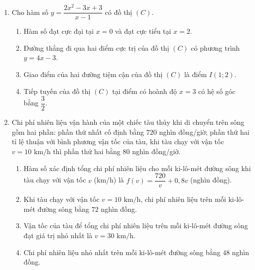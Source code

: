 \documentclass[12pt,a4paper]{article}
\begin{document}
\begin{enumerate}[label=\textbf{Câu \arabic*:}, leftmargin=*]

\item Cho hàm số $y = \dfrac{2x^2 - 3x + 3}{x - 1}$ có đồ thị $(C)$.
\begin{enumerate}[label=\textbf{\alph*)}]
    \item Hàm số đạt cực đại tại $x = 0$ và đạt cực tiểu tại $x = 2$.
    \item Đường thẳng đi qua hai điểm cực trị của đồ thị $(C)$ có phương trình $y = 4x - 3$.
    \item Giao điểm của hai đường tiệm cận của đồ thị $(C)$ là điểm $I(1; 2)$.
    \item Tiếp tuyến của đồ thị $(C)$ tại điểm có hoành độ $x = 3$ có hệ số góc bằng $\dfrac{3}{2}$.
\end{enumerate}

\item Chi phí nhiên liệu vận hành của một chiếc tàu thủy khi di chuyển trên sông gồm hai phần: phần thứ nhất cố định bằng $720$ nghìn đồng/giờ; phần thứ hai tỉ lệ thuận với bình phương vận tốc của tàu, khi tàu chạy với vận tốc $v = 10\text{ km/h}$ thì phần thứ hai bằng $80$ nghìn đồng/giờ.
\begin{enumerate}[label=\textbf{\alph*)}]
    \item Hàm số xác định tổng chi phí nhiên liệu cho mỗi ki-lô-mét đường sông khi tàu chạy với vận tốc $v$ (km/h) là $f(v) = \dfrac{720}{v} + 0{,}8v$ (nghìn đồng).
    \item Khi tàu chạy với vận tốc $v = 10\text{ km/h}$, chi phí nhiên liệu trên mỗi ki-lô-mét đường sông bằng $72$ nghìn đồng.
    \item Vận tốc của tàu để tổng chi phí nhiên liệu trên mỗi ki-lô-mét đường sông đạt giá trị nhỏ nhất là $v = 30\text{ km/h}$.
    \item Chi phí nhiên liệu nhỏ nhất trên mỗi ki-lô-mét đường sông bằng $48$ nghìn đồng.
\end{enumerate}


\end{enumerate}
\end{document}
